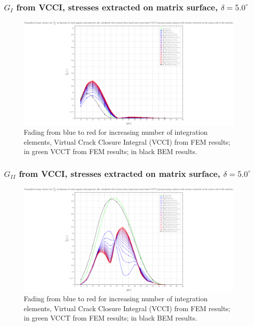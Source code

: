 \begin{frame}
\frametitle{\small $G_{I}$ from VCCI, stresses extracted on matrix surface, $\delta=5.0^{\circ}$}
\vspace{-0.5cm}
\centering
\captionsetup[figure]{font=scriptsize,labelfont=scriptsize}
\begin{figure}[!h]
\centering
\includegraphics[height=0.7\textheight]{2017-07-25_AbqRunSummary_SmallStrain_D05/pdf/2017-07-25_AbqRunSummary_SmallStrain_D05_F-SoM-VCCT_GI.pdf}
  \caption{\scriptsize Fading from blue to red for increasing number of integration elements, Virtual Crack Closure Integral (VCCI) from FEM results; in green VCCT from FEM results; in black BEM results.}
  \label{fig:res1}
\end{figure}
\end{frame}
\begin{frame}
\frametitle{\small $G_{II}$ from VCCI, stresses extracted on matrix surface, $\delta=5.0^{\circ}$}
\vspace{-0.5cm}
\centering
\captionsetup[figure]{font=scriptsize,labelfont=scriptsize}
\begin{figure}[!h]
\centering
\includegraphics[height=0.7\textheight]{2017-07-25_AbqRunSummary_SmallStrain_D05/pdf/2017-07-25_AbqRunSummary_SmallStrain_D05_F-SoM-VCCT_GII.pdf}
  \caption{\scriptsize Fading from blue to red for increasing number of integration elements, Virtual Crack Closure Integral (VCCI) from FEM results; in green VCCT from FEM results; in black BEM results.}
  \label{fig:res1}
\end{figure}
\end{frame}
